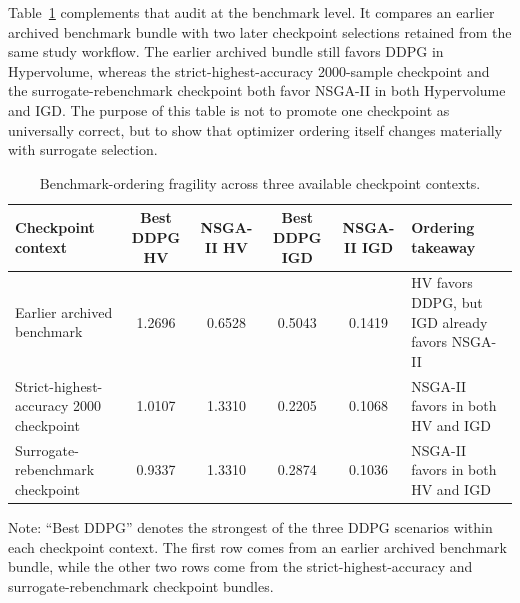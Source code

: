 Table~\ref{tab:supp_checkpoint_rank} complements that audit at the benchmark level. It compares an earlier archived benchmark bundle with two later checkpoint selections retained from the same study workflow. The earlier archived bundle still favors DDPG in Hypervolume, whereas the strict-highest-accuracy 2000-sample checkpoint and the surrogate-rebenchmark checkpoint both favor NSGA-II in both Hypervolume and IGD. The purpose of this table is not to promote one checkpoint as universally correct, but to show that optimizer ordering itself changes materially with surrogate selection.

\begin{table}[H]
\centering
\caption{Benchmark-ordering fragility across three available checkpoint contexts.}
\label{tab:supp_checkpoint_rank}
\begin{threeparttable}
\footnotesize
\begin{tabularx}{\linewidth}{@{}lccccX@{}}
\toprule
Checkpoint context & Best DDPG HV & NSGA-II HV & Best DDPG IGD & NSGA-II IGD & Ordering takeaway \\
\midrule
Earlier archived benchmark & 1.2696 & 0.6528 & 0.5043 & 0.1419 & HV favors DDPG, but IGD already favors NSGA-II \\
Strict-highest-accuracy 2000 checkpoint & 1.0107 & 1.3310 & 0.2205 & 0.1068 & NSGA-II favors in both HV and IGD \\
Surrogate-rebenchmark checkpoint & 0.9337 & 1.3310 & 0.2874 & 0.1036 & NSGA-II favors in both HV and IGD \\
\bottomrule
\end{tabularx}
\begin{tablenotes}[flushleft]
\footnotesize
\item Note: ``Best DDPG'' denotes the strongest of the three DDPG scenarios within each checkpoint context. The first row comes from an earlier archived benchmark bundle, while the other two rows come from the strict-highest-accuracy and surrogate-rebenchmark checkpoint bundles.
\end{tablenotes}
\end{threeparttable}
\end{table}

